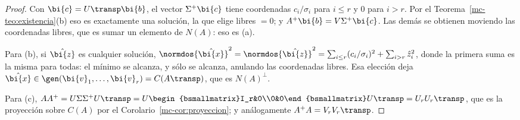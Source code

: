 \begin{proof}
Con $\bi{c}=U\transp\bi{b}$, el vector $\Sigma^{+}\bi{c}$ tiene coordenadas
$c_i/\sigma_i$ para $i\le r$ y $0$ para $i>r$. Por el
Teorema~\ref{mc-teo:existencia}(b) eso es exactamente una solución, la que
elige libres $=0$; y $A^{+}\bi{b}=V\Sigma^{+}\bi{c}$. Las demás se obtienen
moviendo las coordenadas libres, que es sumar un elemento de $N(A)$: eso es (a).

Para (b), si $\hat{\bi{z}}$ es cualquier solución,
$\normdos{\hat{\bi{x}}}^2=\normdos{\hat{\bi{z}}}^2
=\sum_{i\le r}(c_i/\sigma_i)^2+\sum_{i>r}\hat z_i^2$, donde la primera suma es
la misma para todas: el mínimo se alcanza, y sólo se alcanza, anulando las
coordenadas libres. Esa elección deja $\hat{\bi{x}}\in\gen(\bi{v}_1,\dots,\bi{v}_r)
=C(A\transp)$, que es $N(A)^{\perp}$.

Para (c), $AA^{+}=U\Sigma\Sigma^{+}U\transp=U\begin{bsmallmatrix}I_r&0\\0&0\end{bsmallmatrix}U\transp
=U_rU_r\transp$, que es la proyección sobre $C(A)$ por el
Corolario~\ref{mc-cor:proyeccion}; y análogamente
$A^{+}A=V_rV_r\transp$.
\end{proof}

